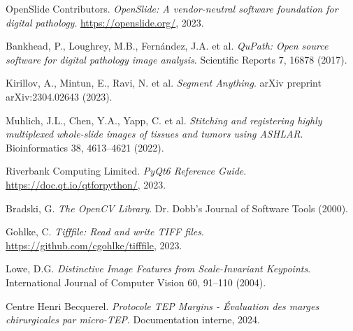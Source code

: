 \documentclass[12pt,a4paper]{report}
\begin{document}
\begin{thebibliography}{9}

OpenSlide Contributors. \textit{OpenSlide: A vendor-neutral software foundation for digital pathology}. 
\url{https://openslide.org/}, 2023.

Bankhead, P., Loughrey, M.B., Fernández, J.A. et al. 
\textit{QuPath: Open source software for digital pathology image analysis}. 
Scientific Reports 7, 16878 (2017).

Kirillov, A., Mintun, E., Ravi, N. et al. 
\textit{Segment Anything}. 
arXiv preprint arXiv:2304.02643 (2023).

Muhlich, J.L., Chen, Y.A., Yapp, C. et al. 
\textit{Stitching and registering highly multiplexed whole-slide images of tissues and tumors using ASHLAR}. 
Bioinformatics 38, 4613–4621 (2022).

Riverbank Computing Limited. 
\textit{PyQt6 Reference Guide}. 
\url{https://doc.qt.io/qtforpython/}, 2023.

Bradski, G. 
\textit{The OpenCV Library}. 
Dr. Dobb's Journal of Software Tools (2000).

Gohlke, C. 
\textit{Tifffile: Read and write TIFF files}. 
\url{https://github.com/cgohlke/tifffile}, 2023.

Lowe, D.G. 
\textit{Distinctive Image Features from Scale-Invariant Keypoints}. 
International Journal of Computer Vision 60, 91–110 (2004).

Centre Henri Becquerel. 
\textit{Protocole TEP Margins - Évaluation des marges chirurgicales par micro-TEP}. 
Documentation interne, 2024.

\end{thebibliography}
\end{document}
